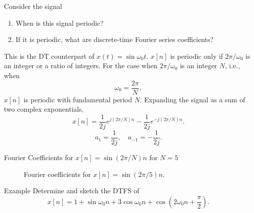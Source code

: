 \begin{frame}
    \begin{example}
        Consider the signal
        \begin{enumerate}
            \item When is this signal periodic?
            \item If it is periodic, what are discrete-time Fourier series coefficients?
        \end{enumerate}
    \end{example}
    \pause
    {
        This is the DT counterpart of $x(t) = \sin \omega_0 t$. $x[n]$ is periodic only if $2\pi/\omega_0$ is an integer or a ratio of integers. For the case when $2\pi/\omega_0$ is an integer $N$, i.e., when
        \begin{equation*}
            \omega_0 = \frac{2\pi}{N},
        \end{equation*}
        $x[n]$ is periodic with fundamental period $N$.
    }
    \pause
    {
        Expanding the signal as a sum of two complex exponentials,
        \begin{equation}
            x[n] = \frac{1}{2j}e^{j(2\pi/N)n} - \frac{1}{2j}e^{-j(2\pi/N)n}.
        \end{equation}
        \pause
        \begin{equation*}
            a_1 = \frac{1}{2j}, \quad a_{-1} = -\frac{1}{2j}.
        \end{equation*}
    }

\end{frame}

\begin{frame}{Fourier Coefficients for $x[n] = \sin(2\pi/N)n$ for $N=5$ }
    \begin{figure}
        \centering
        
        \caption{Fourier coefficients for $x[n] = \sin(2\pi/5)n$.}
    \end{figure}
\end{frame}

\begin{frame}{Example}
    Determine and sketch the DTFS of
    \begin{equation*}
        x[n] = 1 + \sin \omega_0 n + 3 \cos \omega_0 n + \cos\left(2\omega_0 n + \frac{\pi}{2}\right).
    \end{equation*}
    \pause
\end{frame}

\begin{frame}
    \begin{figure}
        \centering
        
    \end{figure}
\end{frame}

